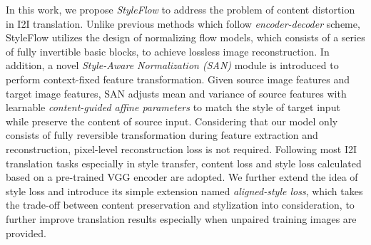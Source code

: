 \documentclass[runningheads]{llncs}
\begin{document}
In this work, we propose \textit{StyleFlow} to address the problem of content distortion in I2I translation. Unlike previous methods which follow \textit{encoder-decoder} scheme, StyleFlow utilizes the design of normalizing flow models\cite{dinh2014nice}, which consists of a series of fully invertible basic blocks, to achieve lossless image reconstruction. In addition, a novel \textit{Style-Aware Normalization (SAN)} module is introduced to perform context-fixed feature transformation. Given source image features and target image features, SAN adjusts mean and variance of source features with learnable \textit{content-guided affine parameters} to match the style of target input while preserve the content of source input. Considering that our model only consists of fully reversible transformation during feature extraction and reconstruction, pixel-level reconstruction loss is not required. Following most I2I translation tasks especially in style transfer\cite{gatys2015texture}, content loss and style loss calculated based on a pre-trained VGG encoder\cite{Simonyan2015very} are adopted. We further extend the idea of style loss and introduce its simple extension named \textit{aligned-style loss}, which takes the trade-off between content preservation and stylization into consideration, to further improve translation results especially when unpaired training images are provided.
\end{document}
